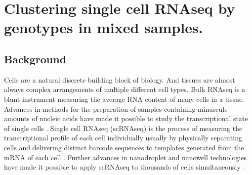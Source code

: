 
\chapter{Clustering single cell RNAseq by genotypes in mixed samples.}

\ifpdf
    \graphicspath{{Chapter2/Figs/Raster/}{Chapter2/Figs/PDF/}{Chapter2/Figs/}}
\else
    \graphicspath{{Chapter2/Figs/Vector/}{Chapter2/Figs/}}
\fi



\section{Background}
Cells are a natural discrete building block of biology. And tissues are almost always complex arrangements of multiple different cell types. Bulk RNAseq is a blunt 
instrument measuring the average RNA content of many cells in a tissue. 
Advances in methods for the preparation of samples containing minuscule amounts of nucleic acids have made it possible to study the transcriptional state of single cells \cite{first_singlecell}.
Single cell RNAseq (scRNAseq) is the process of measuring the transcriptional profile of each cell individually usually by physically separating cells and delivering distinct barcode sequences to templates generated from the mRNA of each cell \cite{smartseq2}.
Further advances in nanodroplet and nanowell technologies have made it possible to apply scRNAseq to thousands of cells simultaneously \cite{dropseq}\cite{10xsinglecell}\cite{seqwell}. 





